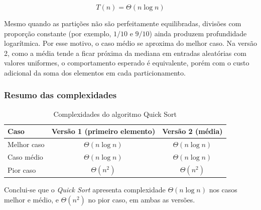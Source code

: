 \begin{equation}
T(n) = \Theta(n\log n)
\end{equation}

Mesmo quando as partições não são perfeitamente equilibradas, divisões
com proporção constante (por exemplo, $1/10$ e $9/10$) ainda produzem
profundidade logarítmica. Por esse motivo, o caso médio se aproxima do
melhor caso. Na versão 2, como a média tende a ficar próxima da mediana
em entradas aleatórias com valores uniformes, o comportamento esperado é
equivalente, porém com o custo adicional da soma dos elementos em cada
particionamento.

\subsubsection{Resumo das complexidades}

\begin{table}[H]
    \centering
    \caption{Complexidades do algoritmo Quick Sort}
    \label{tab:complexidade-quick}
    \begin{tabular}{lcc}
        \hline
        \textbf{Caso} & \textbf{Versão 1 (primeiro elemento)} & \textbf{Versão 2 (média)} \\
        \hline
        Melhor caso & $\Theta(n\log n)$ & $\Theta(n\log n)$ \\
        Caso médio & $\Theta(n\log n)$ & $\Theta(n\log n)$ \\
        Pior caso & $\Theta(n^2)$ & $\Theta(n^2)$ \\
        \hline
    \end{tabular}
\end{table}

\quad Conclui-se que o \textit{Quick Sort} apresenta complexidade
$\Theta(n\log n)$ nos casos melhor e médio, e $\Theta(n^2)$ no pior caso,
em ambas as versões.
